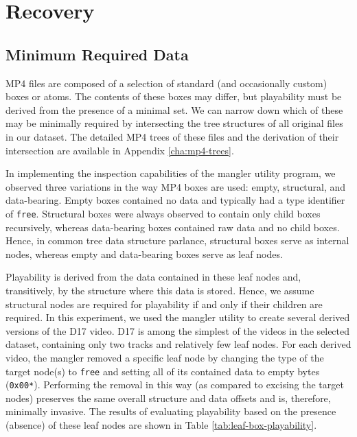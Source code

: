 \section{Recovery}

\subsection{Minimum Required Data}

MP4 files are composed of a selection of standard (and occasionally custom) boxes or atoms. The contents of these boxes may differ, but playability must be derived from the presence of a minimal set. We can narrow down which of these may be minimally required by intersecting the tree structures of all original files in our dataset. The detailed MP4 trees of these files and the derivation of their intersection are available in Appendix \ref{cha:mp4-trees}.

In implementing the inspection capabilities of the mangler utility program, we observed three variations in the way MP4 boxes are used: empty, structural, and data-bearing. Empty boxes contained no data and typically had a type identifier of \texttt{free}. Structural boxes were always observed to contain only child boxes recursively, whereas data-bearing boxes contained raw data and no child boxes. Hence, in common tree data structure parlance, structural boxes serve as internal nodes, whereas empty and data-bearing boxes serve as leaf nodes.

Playability is derived from the data contained in these leaf nodes and, transitively, by the structure where this data is stored. Hence, we assume structural nodes are required for playability if and only if their children are required. In this experiment, we used the mangler utility to create several derived versions of the D17 video. D17 is among the simplest of the videos in the selected dataset, containing only two tracks and relatively few leaf nodes. For each derived video, the mangler removed a specific leaf node by changing the type of the target node(s) to \texttt{free} and setting all of its contained data to empty bytes (\texttt{0x00*}). Performing the removal in this way (as compared to excising the target nodes) preserves the same overall structure and data offsets and is, therefore, minimally invasive. The results of evaluating playability based on the presence (absence) of these leaf nodes are shown in Table \ref{tab:leaf-box-playability}.

